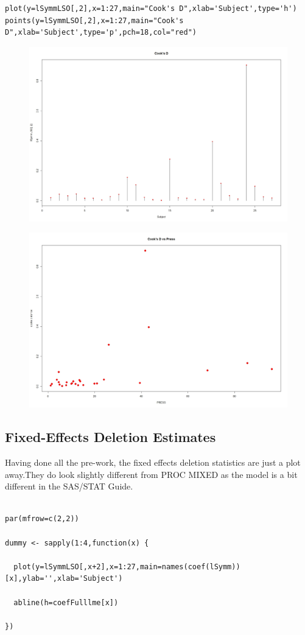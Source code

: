 \documentclass[a4paper,12pt]{article}
\begin{document}
\begin{framed}
	\begin{verbatim}
plot(y=lSymmLSO[,2],x=1:27,main="Cook's D",xlab='Subject',type='h')
points(y=lSymmLSO[,2],x=1:27,main="Cook's D",xlab='Subject',type='p',pch=18,col="red")

\end{verbatim}
\end{framed}
\begin{figure}[h!]
\centering
\includegraphics[width=0.7\linewidth]{images/RbloggersPlot2}

\end{figure}

\begin{figure}[h!]
	\centering
	\includegraphics[width=0.7\linewidth]{images/RbloggersPlot3}
	
\end{figure}
\newpage
\subsection{Fixed-Effects Deletion Estimates}

Having done all the pre-work, the fixed effects deletion statistics are just a plot away.They do look slightly different from PROC MIXED as the model is a bit different in the SAS/STAT Guide.
\begin{framed}
	\begin{verbatim}

par(mfrow=c(2,2))

dummy <- sapply(1:4,function(x) {

  plot(y=lSymmLSO[,x+2],x=1:27,main=names(coef(lSymm))[x],ylab='',xlab='Subject')

  abline(h=coefFulllme[x])

})

\end{verbatim}
\end{framed}
\end{document}
